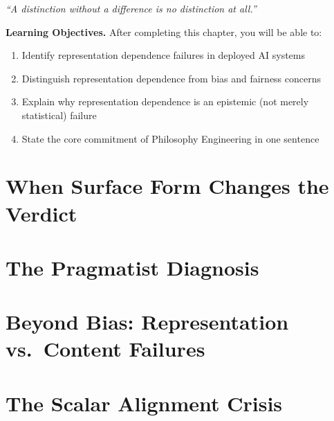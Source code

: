 \documentclass[12pt,letterpaper,twoside,openright]{book}
\theoremstyle{plain}
\theoremstyle{definition}
\theoremstyle{remark}
\begin{document}
\begin{epigraph}
\textit{``A distinction without a difference is no distinction at all.''}
\end{epigraph}

\begin{framed}
\noindent\textbf{Learning Objectives.} After completing this chapter, you will be able to:
\begin{enumerate}
    \item Identify representation dependence failures in deployed AI systems
    \item Distinguish representation dependence from bias and fairness concerns
    \item Explain why representation dependence is an epistemic (not merely statistical) failure
    \item State the core commitment of Philosophy Engineering in one sentence
\end{enumerate}
\end{framed}

\section{When Surface Form Changes the Verdict}

\section{The Pragmatist Diagnosis}

\section{Beyond Bias: Representation vs.\ Content Failures}

\section{The Scalar Alignment Crisis}
\end{document}
